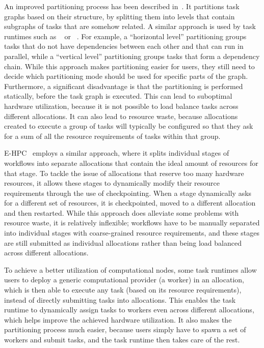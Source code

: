 An improved partitioning process has been described in~\cite{zhang_batch_scheduling}. It partitions task
graphs based on their structure, by splitting them into levels that contain subgraphs of tasks that
are somehow related. A similar approach is used by task runtimes such as
\pegasus{}~\cite{pegasus} or \autosubmit~\cite{autosubmit}. For
example, a ``horizontal level'' partitioning groups tasks that do not have dependencies between
each other and that can run in parallel, while a ``vertical level'' partitioning groups tasks that
form a dependency chain. While this approach makes partitioning easier for users, they still need
to decide which partitioning mode should be used for specific parts of the graph. Furthermore, a
significant disadvantage is that the partitioning is performed statically, before the task graph is
executed. This can lead to suboptimal hardware utilization, because it is not possible to load
balance tasks across different allocations. It can also lead to resource waste, because allocations
created to execute a group of tasks will typically be configured so that they ask for a sum of all
the resource requirements of tasks within that group.

\textsc{E-HPC}~\cite{ehpc} employs a similar approach, where it splits
individual stages of workflows into separate allocations that contain the ideal amount of resources
for that stage. To tackle the issue of allocations that reserve too many hardware resources, it
allows these stages to dynamically modify their resource requirements through the use of
checkpointing. When a stage dynamically asks for a different set of resources, it is checkpointed,
moved to a different allocation and then restarted. While this approach does alleviate some
problems with resource waste, it is relatively inflexible; workflows have to be manually separated
into individual stages with coarse-grained resource requirements, and these stages are still
submitted as individual allocations rather than being load balanced across different allocations.

To achieve a better utilization of computational nodes, some task runtimes allow users to deploy a
generic computational provider (a worker) in an allocation, which is then able to execute any task
(based on its resource requirements), instead of directly submitting tasks into allocations. This
enables the task runtime to dynamically assign tasks to workers even across different allocations,
which helps improve the achieved hardware utilization. It also makes the partitioning process much
easier, because users simply have to spawn a set of workers and submit tasks, and the task runtime
then takes care of the rest.

